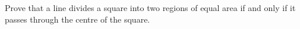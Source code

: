 Prove that a line divides a square into two regions of equal area if and only if it passes through the centre of the square.
